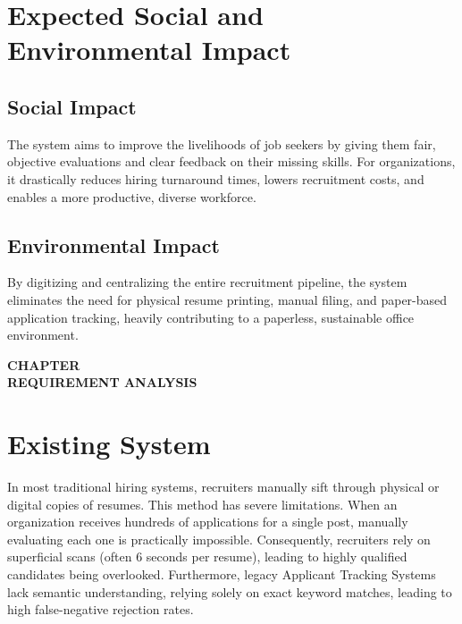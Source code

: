 \documentclass[12pt,a4paper]{report}
\newcommand{\chaptertitlepage}[1]{%
\cleardoublepage
\thispagestyle{empty}
\null
\vfill
\begin{center}
{\fontsize{16pt}{18pt}\selectfont\bfseries
CHAPTER \thechapter}\\[0.5cm]
{\fontsize{16pt}{18pt}\selectfont\bfseries
#1}
\end{center}
\vfill
\null
\clearpage
}
\begin{document}
\section{Expected Social and Environmental Impact}
\subsection{Social Impact}
The system aims to improve the livelihoods of job seekers by giving them fair, objective evaluations and clear feedback on their missing skills. For organizations, it drastically reduces hiring turnaround times, lowers recruitment costs, and enables a more productive, diverse workforce.
\subsection{Environmental Impact}
By digitizing and centralizing the entire recruitment pipeline, the system eliminates the need for physical resume printing, manual filing, and paper-based application tracking, heavily contributing to a paperless, sustainable office environment.

\chaptertitlepage{REQUIREMENT ANALYSIS}
\section{Existing System}
In most traditional hiring systems, recruiters manually sift through physical or digital copies of resumes. This method has severe limitations. When an organization receives hundreds of applications for a single post, manually evaluating each one is practically impossible. Consequently, recruiters rely on superficial scans (often 6 seconds per resume), leading to highly qualified candidates being overlooked. Furthermore, legacy Applicant Tracking Systems lack semantic understanding, relying solely on exact keyword matches, leading to high false-negative rejection rates.
\end{document}
